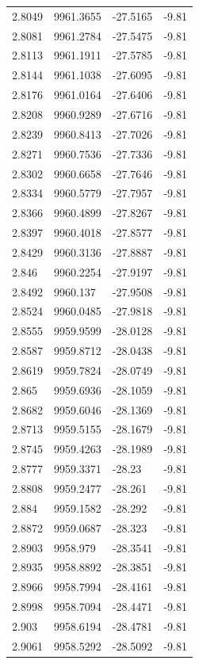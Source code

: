 \begin{table}[H]
\begin{tabular}{llll}
2.8049 & 9961.3655 & -27.5165 & -9.81 \\
2.8081 & 9961.2784 & -27.5475 & -9.81 \\
2.8113 & 9961.1911 & -27.5785 & -9.81 \\
2.8144 & 9961.1038 & -27.6095 & -9.81 \\
2.8176 & 9961.0164 & -27.6406 & -9.81 \\
2.8208 & 9960.9289 & -27.6716 & -9.81 \\
2.8239 & 9960.8413 & -27.7026 & -9.81 \\
2.8271 & 9960.7536 & -27.7336 & -9.81 \\
2.8302 & 9960.6658 & -27.7646 & -9.81 \\
2.8334 & 9960.5779 & -27.7957 & -9.81 \\
2.8366 & 9960.4899 & -27.8267 & -9.81 \\
2.8397 & 9960.4018 & -27.8577 & -9.81 \\
2.8429 & 9960.3136 & -27.8887 & -9.81 \\
2.846 & 9960.2254 & -27.9197 & -9.81 \\
2.8492 & 9960.137 & -27.9508 & -9.81 \\
2.8524 & 9960.0485 & -27.9818 & -9.81 \\
2.8555 & 9959.9599 & -28.0128 & -9.81 \\
2.8587 & 9959.8712 & -28.0438 & -9.81 \\
2.8619 & 9959.7824 & -28.0749 & -9.81 \\
2.865 & 9959.6936 & -28.1059 & -9.81 \\
2.8682 & 9959.6046 & -28.1369 & -9.81 \\
2.8713 & 9959.5155 & -28.1679 & -9.81 \\
2.8745 & 9959.4263 & -28.1989 & -9.81 \\
2.8777 & 9959.3371 & -28.23 & -9.81 \\
2.8808 & 9959.2477 & -28.261 & -9.81 \\
2.884 & 9959.1582 & -28.292 & -9.81 \\
2.8872 & 9959.0687 & -28.323 & -9.81 \\
2.8903 & 9958.979 & -28.3541 & -9.81 \\
2.8935 & 9958.8892 & -28.3851 & -9.81 \\
2.8966 & 9958.7994 & -28.4161 & -9.81 \\
2.8998 & 9958.7094 & -28.4471 & -9.81 \\
2.903 & 9958.6194 & -28.4781 & -9.81 \\
2.9061 & 9958.5292 & -28.5092 & -9.81 \\

\end{tabular}
\end{table}
